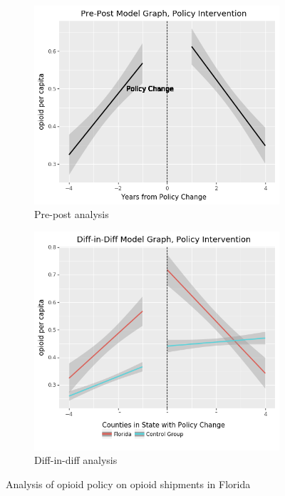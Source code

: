 \documentclass[12pt,letterpaper]{article}
\begin{document}
\begin{figure}[!h]
\centering
\begin{subfigure}{.5\textwidth}
  \centering
  \includegraphics[width=.9\linewidth]{../30_results/General_Results/florida_opioid_shipment_prepost.png}
  \caption{Pre-post analysis}
  \label{fig:fl_ship_prepost}
\end{subfigure}%
\begin{subfigure}{.5\textwidth}
  \centering
  \includegraphics[width=.9\linewidth]{../30_results/General_Results/florida_opioid_shipment_diffdiff.png}
  \caption{Diff-in-diff analysis}
  \label{fig:fl_ship_did}
\end{subfigure}
\caption{Analysis of opioid policy on opioid shipments in Florida}
\label{fig:fl_ship}
\end{figure}
\end{document}
